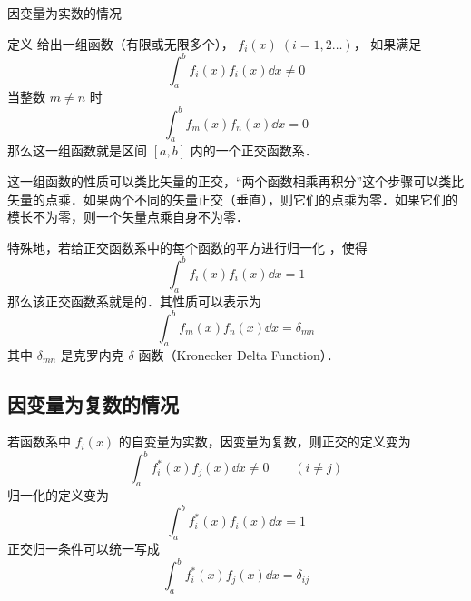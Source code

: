 
因变量为实数的情况

定义
给出一组函数（有限或无限多个）， $f_i(x)\; (i = 1,2\dots)$， 如果满足
\begin{equation}
\int_a^b f_i(x) f_i(x) \dd{x} \ne 0
\end{equation} 
当整数 $m \ne n$ 时
\begin{equation}
\int_a^b f_m(x) f_n(x) \dd{x} = 0
\end{equation} 
那么这一组函数就是区间 $[a,b]$ 内的一个正交函数系．

这一组函数的性质可以类比矢量的正交，“两个函数相乘再积分”这个步骤可以类比矢量的点乘．如果两个不同的矢量正交（垂直），则它们的点乘为零．如果它们的模长不为零，则一个矢量点乘自身不为零．

特殊地，若给正交函数系中的每个函数的平方进行归一化%
，使得
\begin{equation}
\int_a^b f_i(x) f_i(x) \dd{x} = 1
\end{equation} 
那么该正交函数系就是的．其性质可以表示为
 \begin{equation}
\int_a^b f_m(x) f_n(x) \dd{x} = \delta_{mn}
\end{equation} 
其中 $\delta_{mn}$ 是克罗内克 $\delta$ 函数（Kronecker Delta Function）．


\subsection{因变量为复数的情况}

若函数系中 $f_i(x)$ 的自变量为实数，因变量为复数，则正交的定义变为
 \begin{equation}
\int_a^b f_i^*(x) f_j(x) \dd{x} \ne 0 \qquad ( i \ne j )
\end{equation}    
归一化的定义变为
 \begin{equation}
\int_a^b f_i^*(x) f_i(x) \dd{x} = 1
\end{equation} 
正交归一条件可以统一写成
 \begin{equation}
\int_a^b f_i^*(x) f_j(x) \dd{x} = \delta_{ij}
\end{equation}